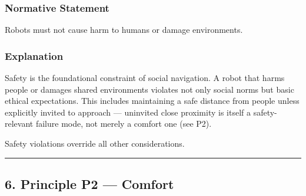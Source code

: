 \documentclass[utf8]{frontiers_suppmat} %
\newenvironment{Shaded}{\begin{shaded}}{\end{shaded}}
\begin{document}
\subsubsection{Normative Statement}\label{normative-statement-1}

Robots must not cause harm to humans or damage environments.

\subsubsection{Explanation}\label{explanation-1}

Safety is the foundational constraint of social navigation. A robot that
harms people or damages shared environments violates not only social
norms but basic ethical expectations. This includes maintaining a safe
distance from people unless explicitly invited to approach --- uninvited
close proximity is itself a safety-relevant failure mode, not merely a
comfort one (see P2).

Safety violations override all other considerations.

\begin{Shaded}
\begin{Highlighting}[]
\KeywordTok{:}
\KeywordTok{:}
\KeywordTok{:}
\KeywordTok{: }\CharTok{\textgreater{}}
\KeywordTok{:}
\AttributeTok{  }\KeywordTok{:}
\AttributeTok{    }\KeywordTok{{-}}\AttributeTok{ }
\AttributeTok{    }\KeywordTok{{-}}\AttributeTok{ }
\AttributeTok{  }\KeywordTok{:}
\AttributeTok{    }\KeywordTok{{-}}\AttributeTok{ }
\AttributeTok{    }\KeywordTok{{-}}\AttributeTok{ }
\end{Highlighting}
\end{Shaded}

\begin{center}\rule{0.5\linewidth}{0.5pt}\end{center}

\subsection{6. Principle P2 --- Comfort}\label{principle-p2-comfort}
\end{document}
